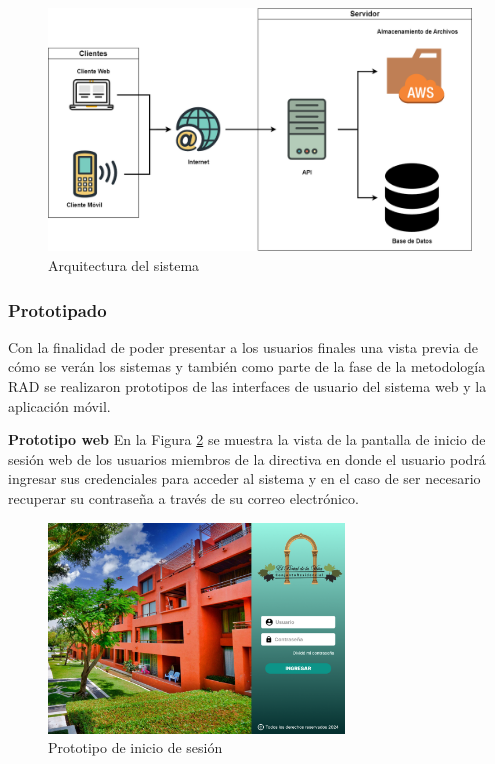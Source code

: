 \begin{figure}[H]
    \centering
    \includegraphics[width=1\textwidth]{resources/images/Arquitectura}
    \caption{Arquitectura del sistema}
    \label{fig:arquitectura}
\end{figure}

\subsubsection{Prototipado}

Con la finalidad de poder presentar a los usuarios finales una vista previa de cómo se verán los sistemas y también como parte de la fase de la metodología RAD se realizaron prototipos de las interfaces de usuario del sistema web y la aplicación móvil.
\bigbreak

\textbf{Prototipo web}
\bigbreak
En la Figura \ref{fig:login} se muestra la vista de la pantalla de inicio de sesión web de los usuarios miembros de la directiva en donde el usuario podrá ingresar sus credenciales para acceder al sistema y en el caso de ser necesario recuperar su contraseña a través de su correo electrónico.

\begin{figure}[H]
    \centering
    \includegraphics[width=0.7\textwidth]{resources/images/login}
    \caption{Prototipo de inicio de sesión}
    \label{fig:login}
\end{figure}

